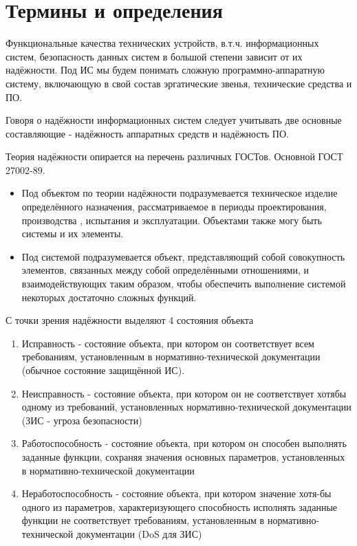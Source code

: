 \documentclass[a4paper, 12pt]{extarticle}
\begin{document}
		\def \nocredits {}
		\def \LineC {Конспект по дисциплине}
		\def \LineD {Защищённые информационные системы}
		\def \LineE {}
		\def \LineF {}
		\def \LineG {}
		\def \LineH {}
		
\maketitle

	\section{Термины и определения}

		Функциональные качества  технических устройств, в.т.ч. информационных систем, безопасность данных систем в большой степени зависит от их надёжности.
		Под ИС мы будем понимать сложную программно-аппаратную систему, включающую в свой состав эргатические звенья, технические средства и ПО.

		Говоря о надёжности информационных систем следует учитывать две основные составляющие - надёжность аппаратных средств и надёжность ПО.

		Теория надёжности опирается на перечень различных ГОСТов. Основной ГОСТ 27002-89.
		\begin{itemize}
			\item Под объектом по теории надёжности подразумевается техническое изделие определённого назначения, рассматриваемое в периоды проектирования, производства , испытания и эксплуатации. Объектами также могу быть системы и их элементы.
			\item Под системой подразумевается объект, представляющий собой совокупность элементов, связанных между собой определёнными отношениями, и взаимодействующих таким образом, чтобы обеспечить выполнение системой некоторых достаточно сложных функций.
		\end{itemize}

		С точки зрения надёжности выделяют 4 состояния объекта
		\begin{enumerate}
			\item Исправность - состояние объекта, при котором он соответствует всем требованиям, установленным в нормативно-технической документации (обычное состояние защищённой ИС).
			\item Неисправность - состояние объекта, при котором он не соответствует хотябы одному из требований, установленных нормативно-технической документации (ЗИС - угроза безопасности)
			\item Работоспособность - состояние объекта, при котором он способен выполнять заданные функции, сохраняя значения основных параметров, установленных в нормативно-технической документации
			\item Неработоспособность - состояние объекта, при котором значение хотя-бы одного из параметров, характеризующего способность исполнять заданные функции не соответствует требованиям, установленным в нормативно-технической документации (DoS для ЗИС)
		\end{enumerate}
\end{document}
